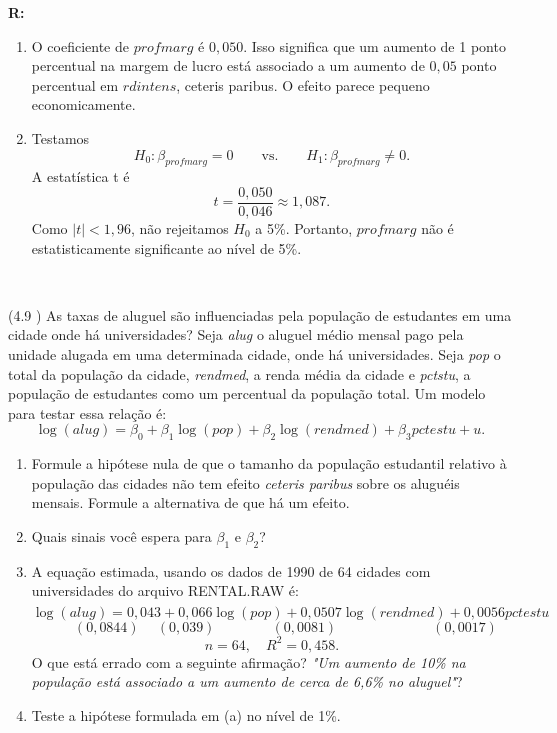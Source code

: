 \documentclass[12pt,letterpaper, onecolumn]{exam}
\renewenvironment{solution}
  {\par\noindent\textbf{R:}\enspace\color{blue}}
  {\par\color{black}}
\begin{document}
\begin{questions}
\begin{solution}
\begin{enumerate}[label=(\alph*)]
    \item O coeficiente de \(profmarg\) é \(0,050\). Isso significa que um aumento de 1 ponto percentual na margem de lucro está associado a um aumento de \(0,05\) ponto percentual em \(rdintens\), ceteris paribus. O efeito parece pequeno economicamente.

    \item Testamos
    \[
    H_0:\beta_{profmarg}=0
    \qquad \text{vs.} \qquad
    H_1:\beta_{profmarg}\neq 0.
    \]
    A estatística t é
    \[
    t=\frac{0,050}{0,046}\approx 1,087.
    \]
    Como \(|t|<1,96\), não rejeitamos \(H_0\) a 5\%. Portanto, \(profmarg\) não é estatisticamente significante ao nível de 5\%.
\end{enumerate}
\end{solution}

\
\


    
    \question (4.9 \citep{wooldridge2010}) As taxas de aluguel são influenciadas pela população de estudantes em uma cidade onde há universidades? Seja \textit{alug} o aluguel médio mensal pago pela unidade alugada em uma determinada cidade, onde há universidades. Seja \textit{pop} o total da população da cidade, \textit{rendmed}, a renda média da cidade e \textit{pctstu}, a população de estudantes como um percentual da população total. Um modelo para testar essa relação é:
    \[
    \log(alug) = \beta_0 + \beta_1\log(pop) + \beta_2\log(rendmed) + \beta_3pctestu + u.
    \]
    \begin{enumerate}[label = (\alph*)]
        \item Formule a hipótese nula de que o tamanho da população estudantil relativo à população das cidades não tem efeito \textit{ceteris paribus} sobre os aluguéis mensais. Formule a alternativa de que há um efeito.
        \item Quais sinais você espera para $\beta_1$ e $\beta_2$?
        \item A equação estimada, usando os dados de 1990 de 64 cidades com universidades do arquivo RENTAL.RAW é:
        \[
        \widehat{\log(alug)} = 0,043 + 0,066\log(pop) + 0,0507\log(rendmed) + 0,0056pctestu
        \]\vspace{-2.0em}\[
        \phantom{--} (0,0844) \phantom{-} (0,039) \phantom{----} (0,0081) \phantom{-------} (0,0017)
        \]\vspace{-1.em}\[
        n = 64, \quad R^2 = 0,458.
        \] O que está errado com a seguinte afirmação? \textit{"Um aumento de 10\% na população está associado a um aumento de cerca de 6,6\% no aluguel"}?
        \item Teste a hipótese formulada em (a) no nível de 1\%.
    \end{enumerate}


\end{questions}
\end{document}
